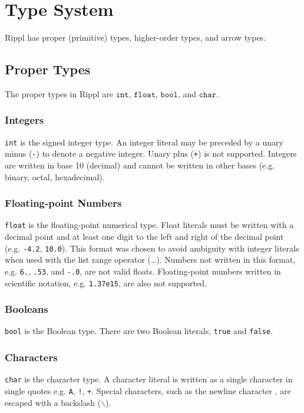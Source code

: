 \documentclass[5pt]{article}
\newcommand{\sq}{\textquotesingle}
\begin{document}
\section{Type System}
Rippl has proper (primitive) types, higher-order types, and arrow types.

\subsection{Proper Types}
The proper types in Rippl are $\texttt{int}$, $\texttt{float}$, $\texttt{bool}$, and $\texttt{char}$.
\subsubsection{Integers}
\texttt{int} is the signed integer type. An integer literal may be preceded by a unary minus (\texttt{-}) to denote a negative integer. Unary plus (\texttt{+}) is not supported. Integers are written in base 10 (decimal) and cannot be written in other bases (e.g. binary, octal, hexadecimal).

\subsubsection{Floating-point Numbers}
\texttt{float} is the floating-point numerical type. Float literals must be written with a decimal point and at least one digit to the left and right of the decimal point (e.g. \texttt{-4.2}, \texttt{10.0}). This format was chosen to avoid ambiguity with integer literals when used with the list range operator (\dots). Numbers not written in this format, e.g. \texttt{6.}, \texttt{.53}, and \texttt{-.0}, are not valid floats. Floating-point numbers written in scientific notation, e.g. \texttt{1.37e15}, are also not supported.
\subsubsection{Booleans}
\texttt{bool} is the Boolean type. There are two Boolean literals, \texttt{true} and \texttt{false}.
\subsubsection{Characters}
\texttt{char} is the character type. A character literal is written as a single character in single quotes e.g. \texttt{\sq A\sq}, \texttt{\sq !\sq}, \texttt{\sq+\sq}. Special characters, such as the newline character \sq\texttt{\string\n}\sq, are escaped with a backslash ($\backslash$).
\end{document}
